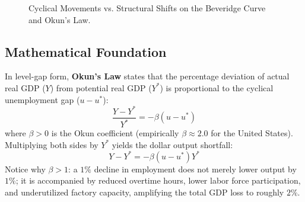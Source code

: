 \documentclass[11pt, a4paper]{article}
\begin{document}
\begin{figure}[htbp]
\caption{Cyclical Movements vs. Structural Shifts on the Beveridge Curve and Okun's Law.}
\label{fig:beveridge_okun}
\end{figure}

\subsection*{Mathematical Foundation}
In level-gap form, \textbf{Okun's Law} states that the percentage deviation of actual real GDP ($Y$) from potential real GDP ($Y^*$) is proportional to the cyclical unemployment gap ($u - u^*$):
\begin{equation}
  \frac{Y - Y^*}{Y^*} = -\beta (u - u^*)
  \label{eq:okun_gap}
\end{equation}
where $\beta > 0$ is the Okun coefficient (empirically $\beta \approx 2.0$ for the United States). Multiplying both sides by $Y^*$ yields the dollar output shortfall:
\begin{equation}
  Y - Y^* = -\beta (u - u^*) Y^*
  \label{eq:okun_dollar}
\end{equation}
Notice why $\beta > 1$: a $1\%$ decline in employment does not merely lower output by $1\%$; it is accompanied by reduced overtime hours, lower labor force participation, and underutilized factory capacity, amplifying the total GDP loss to roughly $2\%$.
\end{document}

